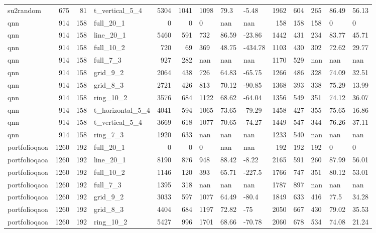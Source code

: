 \begin{longtable}{lrrlrrlllrrlll}
su2random & 675 & 81 & t\_vertical\_5\_4 & 5304 & 1041 & 1098 & 79.3 & -5.48 & 1962 & 604 & 265 & 86.49 & 56.13 \\
qnn & 914 & 158 & full\_20\_1 & 0 & 0 & 0 & nan & nan & 158 & 158 & 158 & 0 & 0 \\
qnn & 914 & 158 & line\_20\_1 & 5460 & 591 & 732 & 86.59 & -23.86 & 1442 & 431 & 234 & 83.77 & 45.71 \\
qnn & 914 & 158 & full\_10\_2 & 720 & 69 & 369 & 48.75 & -434.78 & 1103 & 430 & 302 & 72.62 & 29.77 \\
qnn & 914 & 158 & full\_7\_3 & 927 & 282 & nan & nan & nan & 1170 & 529 & nan & nan & nan \\
qnn & 914 & 158 & grid\_9\_2 & 2064 & 438 & 726 & 64.83 & -65.75 & 1266 & 486 & 328 & 74.09 & 32.51 \\
qnn & 914 & 158 & grid\_8\_3 & 2721 & 426 & 813 & 70.12 & -90.85 & 1368 & 393 & 338 & 75.29 & 13.99 \\
qnn & 914 & 158 & ring\_10\_2 & 3576 & 684 & 1122 & 68.62 & -64.04 & 1356 & 549 & 351 & 74.12 & 36.07 \\
qnn & 914 & 158 & t\_horizontal\_5\_4 & 4041 & 594 & 1065 & 73.65 & -79.29 & 1458 & 427 & 355 & 75.65 & 16.86 \\
qnn & 914 & 158 & t\_vertical\_5\_4 & 3669 & 618 & 1077 & 70.65 & -74.27 & 1449 & 547 & 344 & 76.26 & 37.11 \\
qnn & 914 & 158 & ring\_7\_3 & 1920 & 633 & nan & nan & nan & 1233 & 540 & nan & nan & nan \\
portfolioqaoa & 1260 & 192 & full\_20\_1 & 0 & 0 & 0 & nan & nan & 192 & 192 & 192 & 0 & 0 \\
portfolioqaoa & 1260 & 192 & line\_20\_1 & 8190 & 876 & 948 & 88.42 & -8.22 & 2165 & 591 & 260 & 87.99 & 56.01 \\
portfolioqaoa & 1260 & 192 & full\_10\_2 & 1146 & 120 & 393 & 65.71 & -227.5 & 1766 & 747 & 351 & 80.12 & 53.01 \\
portfolioqaoa & 1260 & 192 & full\_7\_3 & 1395 & 318 & nan & nan & nan & 1787 & 897 & nan & nan & nan \\
portfolioqaoa & 1260 & 192 & grid\_9\_2 & 3033 & 597 & 1077 & 64.49 & -80.4 & 1849 & 633 & 416 & 77.5 & 34.28 \\
portfolioqaoa & 1260 & 192 & grid\_8\_3 & 4404 & 684 & 1197 & 72.82 & -75 & 2050 & 667 & 430 & 79.02 & 35.53 \\
portfolioqaoa & 1260 & 192 & ring\_10\_2 & 5427 & 996 & 1701 & 68.66 & -70.78 & 2060 & 678 & 534 & 74.08 & 21.24 \\

\end{longtable}
